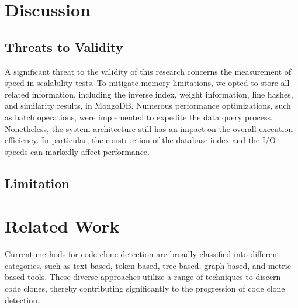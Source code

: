 \section{Discussion}

\subsection{Threats to Validity}
A significant threat to the validity of this research concerns the measurement of speed in scalability tests. To mitigate memory limitations, we opted to store all related information, including the inverse index, weight information, line hashes, and similarity results, in MongoDB. Numerous performance optimizations, such as batch operations, were implemented to expedite the data query process. Nonetheless, the system architecture still has an impact on the overall execution efficiency. In particular, the construction of the database index and the I/O speeds can markedly affect performance.



\subsection{Limitation}




\section{Related Work}
 Current methods for code clone detection are broadly classified into different categories, such as text-based, token-based, tree-based, graph-based, and metric-based tools. 
 These diverse approaches utilize a range of techniques to discern code clones, thereby contributing significantly to the progression of code clone detection.

